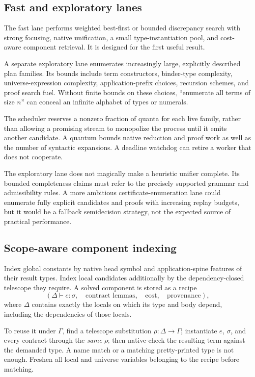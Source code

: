 \documentclass[11pt,a4paper]{article}
\theoremstyle{remark}
\begin{document}
\subsection{Fast and exploratory lanes}

The fast lane performs weighted best-first or bounded discrepancy search with strong focusing, native unification, a small type-instantiation pool, and cost-aware component retrieval. It is designed for the first useful result.

A separate exploratory lane enumerates increasingly large, explicitly described plan families. Its bounds include term constructors, binder-type complexity, universe-expression complexity, application-prefix choices, recursion schemes, and proof search fuel. Without finite bounds on these choices, ``enumerate all terms of size $n$'' can conceal an infinite alphabet of types or numerals.

The scheduler reserves a nonzero fraction of quanta for each live family, rather than allowing a promising stream to monopolize the process until it emits another candidate. A quantum bounds native reduction and proof work as well as the number of syntactic expansions. A deadline watchdog can retire a worker that does not cooperate.

The exploratory lane does not magically make a heuristic unifier complete. Its bounded completeness claims must refer to the precisely supported grammar and admissibility rules. A more ambitious certificate-enumeration lane could enumerate fully explicit candidates and proofs with increasing replay budgets, but it would be a fallback semidecision strategy, not the expected source of practical performance.

\subsection{Scope-aware component indexing}

Index global constants by native head symbol and application-spine features of their result types. Index local candidates additionally by the dependency-closed telescope they require. A solved component is stored as a recipe
\[
 (\Delta\vdash e:\sigma,\quad \text{contract lemmas},\quad \text{cost},\quad \text{provenance}),
\]
where $\Delta$ contains exactly the locals on which its type and body depend, including the dependencies of those locals.

To reuse it under $\Gamma$, find a telescope substitution $\rho:\Delta\to\Gamma$; instantiate $e$, $\sigma$, and every contract through the \emph{same} $\rho$; then native-check the resulting term against the demanded type. A name match or a matching pretty-printed type is not enough. Freshen all local and universe variables belonging to the recipe before matching.
\end{document}

